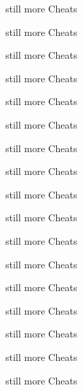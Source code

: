 \documentclass[a4paper
  ,columns=3
]{cheatsheet}
\begin{document}
still more Cheats

still more Cheats

still more Cheats

still more Cheats

still more Cheats

still more Cheats

still more Cheats

still more Cheats

still more Cheats

still more Cheats

still more Cheats

still more Cheats

still more Cheats

still more Cheats

still more Cheats

still more Cheats

still more Cheats
\end{document}
